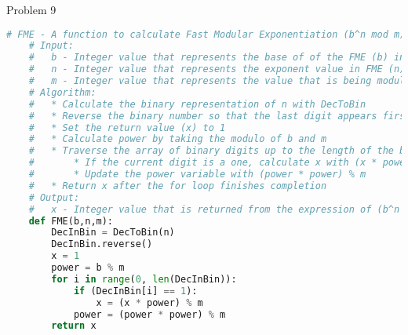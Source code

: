 \begin{problem}{Problem 9}
\begin{highlight}[Solution]
\begin{lstlisting}[style=stackoverflow, language=python]
    # FME - A function to calculate Fast Modular Exponentiation (b^n mod m)
    # Input:
    #   b - Integer value that represents the base of of the FME (b) in (b^n mod m)
    #   n - Integer value that represents the exponent value in FME (n) in (b^n mod m)
    #   m - Integer value that represents the value that is being modulod against in FME (m) in (b^n mod m)
    # Algorithm:
    #   * Calculate the binary representation of n with DecToBin
    #   * Reverse the binary number so that the last digit appears first in the array
    #   * Set the return value (x) to 1
    #   * Calculate power by taking the modulo of b and m
    #   * Traverse the array of binary digits up to the length of the binary number
    #       * If the current digit is a one, calculate x with (x * power) % m
    #       * Update the power variable with (power * power) % m
    #   * Return x after the for loop finishes completion
    # Output:
    #   x - Integer value that is returned from the expression of (b^n mod m)
    def FME(b,n,m):
        DecInBin = DecToBin(n)
        DecInBin.reverse()
        x = 1
        power = b % m
        for i in range(0, len(DecInBin)):
            if (DecInBin[i] == 1):
                x = (x * power) % m
            power = (power * power) % m
        return x
    \end{lstlisting}
    \end{highlight}
\end{problem}

